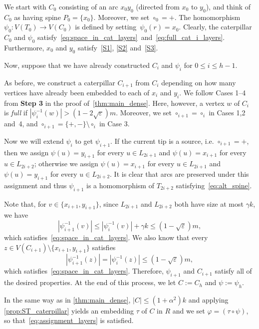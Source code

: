 \documentclass[11pt]{article}
\numberwithin{equation}{section}
\renewcommand{\leq}{\leqslant}
\newcommand{\defi}[1]{\emph{\color{red!50!black}#1}}
\let\eps=\varepsilon
\let\phi=\varphi
\theoremstyle{definition}
\def\eps{{\varepsilon}}
\begin{document}
We start with $C_0$ consisting of an arc $x_0y_0$ (directed from $x_0$ to $y_0$), and think of $C_0$ as having spine $P_0 = \{x_0\}$.
Moreover, we set $\circ_0 = +$.
The homomorphism~${\psi_0:V(T_0) \longrightarrow V(C_0)}$ is defined by setting~${\psi_0(r) = x_0}$.
Clearly, the caterpillar $C_0$ and $\psi_0$ satisfy~\eqref{eq:space_in_cat_layers}~and~\eqref{eq:full_cat_i_layers}. 
Furthermore, $x_0$ and $y_0$ satisfy~\ref{S1}, \ref{S2} and~\ref{S3}.

Now, suppose that we have already constructed $C_i$ and $\psi_i$ for $0\leq i\leq h-1$.

As before, we construct a caterpillar $C_{i+1}$ from $C_i$ depending on how many vertices have already been embedded to each of $x_i$ and $y_i$. 
We follow Cases 1--4 from \textbf{Step 3} in the proof of~\cref{thm:main_dense}. Here, however, a vertex $w$ of $C_i$ is
\defi{full} if $|\psi_i^{-1}(w)| > (1-2\sqrt{\eps})m$. Moreover, we set $\circ_{i+1} = \circ_i$ in Cases 1,2 and~4, and
$\circ_{i+1} = \{+,-\} \setminus \circ_i$ in Case 3.

Now we will extend $\psi_{i}$ to get $\psi_{i+1}$. If the current tip is a source, i.e. $\circ_{i+1} = +$,
then we assign $\psi(u) = y_{i+1}$ for every $u\in L_{2i+1}$ and $\psi(u) = x_{i+1}$ for every~${u\in L_{2i+2}}$; otherwise
we assign $\psi(u) = x_{i+1}$ for every $u \in L_{2i+1}$ and $\psi(u) = y_{i+1}$ for every $u\in L_{2i+2}$.
It is clear that arcs are preserved under this assignment and thus $\psi_{i+1}$ is a homomorphism of $T_{2i+2}$ satisfying~\eqref{eq:alt_spine}.

Note that, for $v \in \{x_{i+1}, y_{i+1}\}$, since $L_{2i+1}$ and $L_{2i+2}$ both have size at most $\gamma k$, we have
\[
    |\psi^{-1}_{i+1}(v)| \leq |\psi^{-1}_{i}(v)| + \gamma k \leq (1-\sqrt{\eps})m,
\]
which satisfies~\eqref{eq:space_in_cat_layers}. We also know that every $z \in V(C_{i+1})\setminus \{x_{i+1},y_{i+1}\}$ satisfies
\[
    |\psi^{-1}_{i+1}(z)| = |\psi^{-1}_{i}(z)| \leq (1-\sqrt{\eps})m,
\]
which satisfies~\eqref{eq:space_in_cat_layers}. Therefore, $\psi_{i+1}$ and $C_{i+1}$ satisfy all of the desired properties. At the end of this process, we let $C := C_h$ and $\psi := \psi_h$. 

In the same way as in \cref{thm:main_dense}, $|C|\leq (1+\alpha^2)k$ and applying \cref{prop:ST_caterpillar} yields an embedding $\tau$ of $C$ in $R$
and we set $\phi = (\tau \circ \psi)$, so that~\eqref{eq:assignment_layers} is satisfied.
\end{document}
